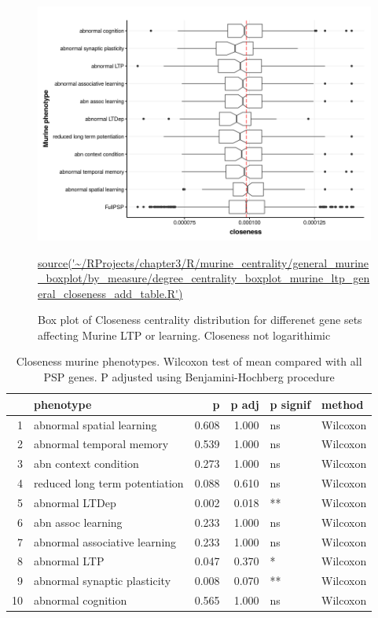 \begin{figure}
    \centering
    \includegraphics[width=\textwidth]{images/chapter3/ggplot2/murine_centrality_boxplot/add_theme/addLTP/Rplot_closeness_editnolog10.png}
    \caption{Box plot of Closeness centrality distribution for differenet gene sets affecting Murine LTP or learning. Closeness not logarithimic} 
   \tiny\url{source('~/RProjects/chapter3/R/murine_centrality/general_murine_boxplot/by_measure/degree_centrality_boxplot_murine_ltp_general_closeness_add_table.R')}
    \label{fig:murine_ltp_centrality_boxplot_closeness}
\end{figure}

\begin{table}[ht]
\centering
\begin{tabular}{rlrrll}
  \toprule
 & phenotype & p & p adj & p signif & method \\ 
  \midrule
1 & abnormal spatial learning & 0.608 & 1.000 & ns & Wilcoxon \\ 
  2 & abnormal temporal memory & 0.539 & 1.000 & ns & Wilcoxon \\ 
  3 & abn context condition & 0.273 & 1.000 & ns & Wilcoxon \\ 
  4 & reduced long term potentiation & 0.088 & 0.610 & ns & Wilcoxon \\ 
  5 & abnormal LTDep & 0.002 & 0.018 & ** & Wilcoxon \\ 
  6 & abn assoc learning & 0.233 & 1.000 & ns & Wilcoxon \\ 
  7 & abnormal associative learning & 0.233 & 1.000 & ns & Wilcoxon \\ 
  8 & abnormal LTP & 0.047 & 0.370 & * & Wilcoxon \\ 
  9 & abnormal synaptic plasticity & 0.008 & 0.070 & ** & Wilcoxon \\ 
  10 & abnormal cognition & 0.565 & 1.000 & ns & Wilcoxon \\ 
   \bottomrule
\end{tabular}
\caption{Closeness murine phenotypes. Wilcoxon test of mean compared with all PSP genes. P adjusted using Benjamini-Hochberg procedure} 
\label{tab:closeness murine phenotypes. Wilcoxon test compared with full PSP.}
\end{table}

